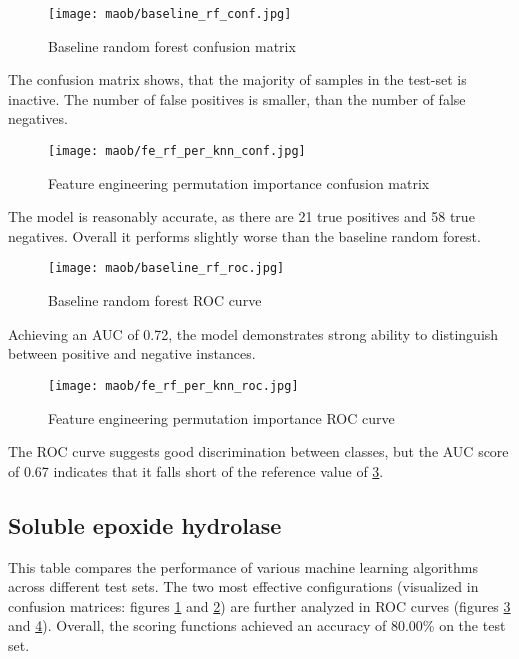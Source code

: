 \begin{figure}[H]
    \begin{center}
        \caption[]{Baseline random forest confusion matrix}
        \label{fig:maob_baseline_rf_conf}
        \texttt{[image: maob/baseline\_rf\_conf.jpg]}
    \end{center}
\end{figure}
The confusion matrix shows, that the majority of samples in the test-set is inactive. The number of false positives is smaller, than the number of false negatives.
\begin{figure}[H]
    \begin{center}
        \caption[]{Feature engineering permutation importance confusion matrix}
        \label{fig:maob_fe_rf_per_knn_conf}
        \texttt{[image: maob/fe\_rf\_per\_knn\_conf.jpg]}
    \end{center}

\end{figure}
The model is reasonably accurate, as there are 21 true positives and 58 true negatives. Overall it performs slightly worse than the baseline random forest.
\begin{figure}[H]
    \begin{center}
        \caption[]{Baseline random forest ROC curve}
        \label{fig:maob_baseline_rf_roc}
        \texttt{[image: maob/baseline\_rf\_roc.jpg]}
    \end{center}

\end{figure}
Achieving an AUC of 0.72, the model demonstrates strong ability to distinguish between positive and negative instances.

\begin{figure}[H]
    \begin{center}
        \caption[]{Feature engineering permutation importance ROC curve}
        \label{fig:maob_fe_rf_per_knn_roc}
        \texttt{[image: maob/fe\_rf\_per\_knn\_roc.jpg]}
    \end{center}
\end{figure}
The ROC curve suggests good discrimination between classes, but the AUC score of 0.67 indicates that it falls short of the reference value of \ref*{fig:maob_baseline_rf_roc}.
\subsection{Soluble epoxide hydrolase}
This table compares the performance of various machine learning algorithms across different test sets.
The two most effective configurations (visualized in confusion matrices: figures \ref{fig:maob_baseline_rf_conf} and \ref{fig:maob_fe_rf_per_knn_conf})
are further analyzed in ROC curves (figures \ref{fig:maob_baseline_rf_roc} and \ref{fig:maob_fe_rf_per_knn_roc}).
Overall, the scoring functions achieved an accuracy of 80.00\% on the test set.


